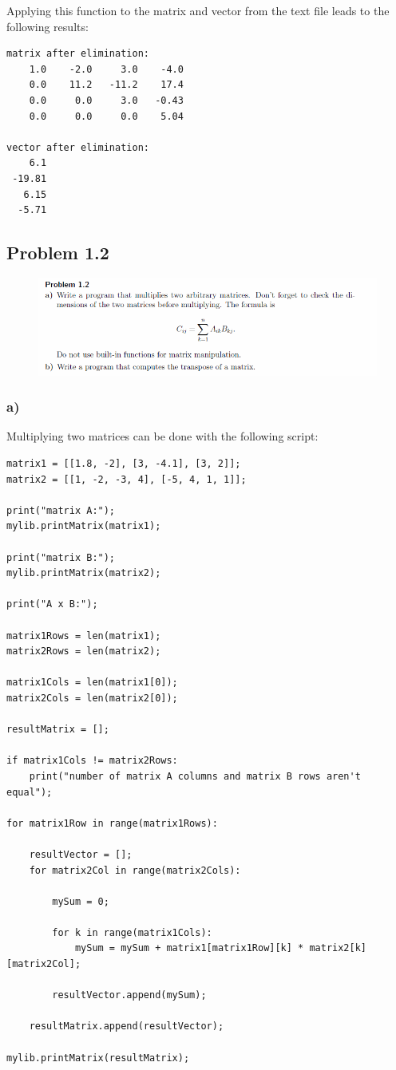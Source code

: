 Applying this function to the matrix and vector from the text file leads to the following results:

\begin{lstlisting}[caption=Result of 1.1 c), keywordstyle=\color{black}]
matrix after elimination:
    1.0    -2.0     3.0    -4.0
    0.0    11.2   -11.2    17.4
    0.0     0.0     3.0   -0.43
    0.0     0.0     0.0    5.04

vector after elimination:
    6.1
 -19.81
   6.15
  -5.71
\end{lstlisting}


\subsection{Problem 1.2}

\begin{figure}[!ht]
\includegraphics[width=1\textwidth]{chapters/images/desc-1-2}
\end{figure}


\subsubsection{a)}

Multiplying two matrices can be done with the following script:

\begin{lstlisting}[caption=Problem 1.2 a)]
matrix1 = [[1.8, -2], [3, -4.1], [3, 2]];
matrix2 = [[1, -2, -3, 4], [-5, 4, 1, 1]];

print("matrix A:");
mylib.printMatrix(matrix1);

print("matrix B:");
mylib.printMatrix(matrix2);

print("A x B:");

matrix1Rows = len(matrix1);
matrix2Rows = len(matrix2);

matrix1Cols = len(matrix1[0]);
matrix2Cols = len(matrix2[0]);

resultMatrix = [];

if matrix1Cols != matrix2Rows:
	print("number of matrix A columns and matrix B rows aren't equal");

for matrix1Row in range(matrix1Rows):

	resultVector = [];
	for matrix2Col in range(matrix2Cols):
		
		mySum = 0;
		
		for k in range(matrix1Cols):
			mySum = mySum + matrix1[matrix1Row][k] * matrix2[k][matrix2Col];
		
		resultVector.append(mySum);
		
	resultMatrix.append(resultVector);

mylib.printMatrix(resultMatrix);
\end{lstlisting}

